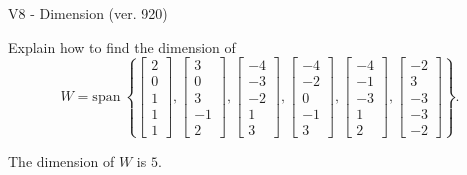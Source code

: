 \begin{exercise}
  \begin{exerciseTitle}V8 - Dimension (ver. 920)\end{exerciseTitle}
  \begin{exerciseStatement}
    Explain how to find the dimension of 
\[W=\mathrm{span}\ \left\{\left[\begin{array}{r}
2 \\
0 \\
1 \\
1 \\
1
\end{array}\right] , \left[\begin{array}{r}
3 \\
0 \\
3 \\
-1 \\
2
\end{array}\right] , \left[\begin{array}{r}
-4 \\
-3 \\
-2 \\
1 \\
3
\end{array}\right] , \left[\begin{array}{r}
-4 \\
-2 \\
0 \\
-1 \\
3
\end{array}\right] , \left[\begin{array}{r}
-4 \\
-1 \\
-3 \\
1 \\
2
\end{array}\right] , \left[\begin{array}{r}
-2 \\
3 \\
-3 \\
-3 \\
-2
\end{array}\right]\right\}.\]



  \end{exerciseStatement}
  \begin{exerciseAnswer}
   The dimension of \(W\) is  \(5\).
  


  \end{exerciseAnswer}
\end{exercise}